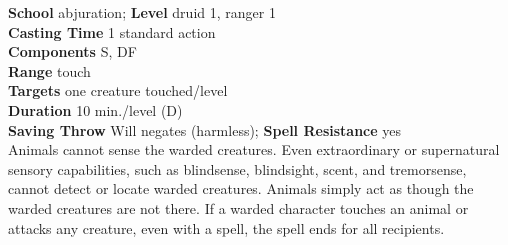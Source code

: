 \textbf{School} abjuration; \textbf{Level} druid 1, ranger 1\\
\textbf{Casting Time} 1 standard action\\
\textbf{Components} S, DF\\
\textbf{Range} touch\\
\textbf{Targets} one creature touched/level\\
\textbf{Duration} 10 min./level (D)\\
\textbf{Saving Throw }Will negates (harmless); \textbf{Spell Resistance} yes\\
Animals cannot sense the warded creatures. Even extraordinary or supernatural sensory capabilities, such as blindsense, blindsight, scent, and tremorsense, cannot detect or locate warded creatures. Animals simply act as though the warded creatures are not there. If a warded character touches an animal or attacks any creature, even with a spell, the spell ends for all recipients.\\
